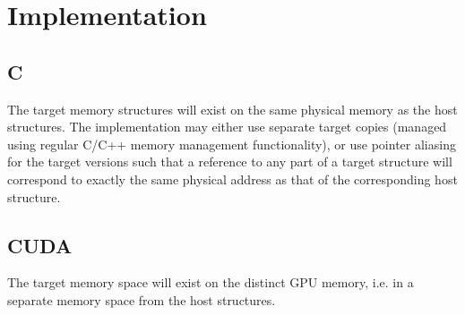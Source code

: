 \begin{comment}
For 3, at the moment any data declared in the function but above the targetTLP keyword will be private for GPU threads but shared for CPU (since outside parallel region). So either need to make this clearer above, or somehow move OpenMP parallel region to target launch. 
\end{comment}


\section{Implementation}
\subsection{C}

The target memory structures will exist on the same physical memory as
the host structures. The implementation may either use separate target
copies (managed using regular C/C++ memory management functionality),
or use pointer aliasing for the target versions such that a reference
to any part of a target structure will correspond to exactly the same
physical address as that of the corresponding host structure.

\subsection{CUDA}

The target memory space will exist on the distinct GPU memory, i.e. in
a separate memory space from the host structures.
